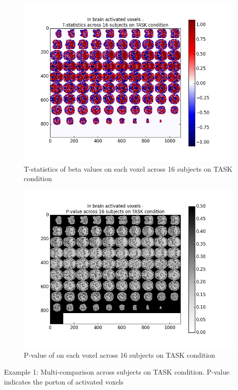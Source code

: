 \begin{figure}[H] 
\centering \includegraphics[scale=0.5]{../fig/multi_beta/tstat_task.png}	 
\caption{T-statistics of beta values on each voxel across 16 subjects on TASK condition}
\end{figure} 

\begin{figure}[H] 
\centering \includegraphics[scale=0.5]{../fig/multi_beta/pval_task.png}	 
\caption{P-value of on each voxel across 16 subjects on TASK condition}
\end{figure} 

\begin{center}
Example 1: Multi-comparison across subjects on TASK condition. P-value indicates the porton of activated
voxels
\end{center}

